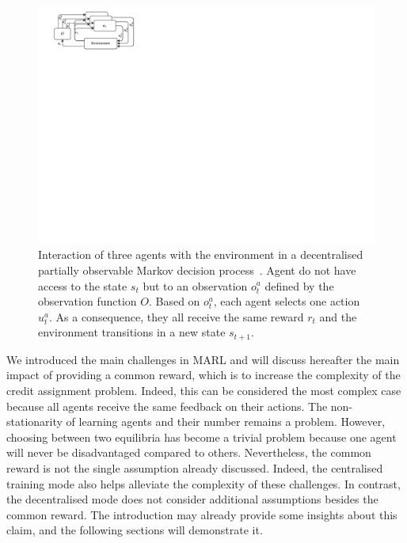 \begin{figure}
    \centering
    \includegraphics[width=0.8\linewidth]{figures/ch3/decpomdp.pdf}
    \caption{Interaction of three agents with the environment in a decentralised partially observable Markov decision process~\citep{DecPomdp}. Agent do not have access to the state $s_t$ but to an observation $o^a_t$ defined by the observation function $O$. Based on $o^a_t$, each agent selects one action $u^a_t$. As a consequence, they all receive the same reward $r_t$ and the environment transitions in a new state $s_{t+1}$.}
    \label{fig:ch3_decpomdp}
\end{figure}

We introduced the main challenges in MARL and will discuss hereafter the main impact of providing a common reward, which is to increase the complexity of the credit assignment problem.
Indeed, this can be considered the most complex case because all agents receive the same feedback on their actions.
The non-stationarity of learning agents and their number remains a problem.
However, choosing between two equilibria has become a trivial problem because one agent will never be disadvantaged compared to others.
Nevertheless, the common reward is not the single assumption already discussed.
Indeed, the centralised training mode also helps alleviate the complexity of these challenges.
In contrast, the decentralised mode does not consider additional assumptions besides the common reward.
The introduction may already provide some insights about this claim, and the following sections will demonstrate it.


